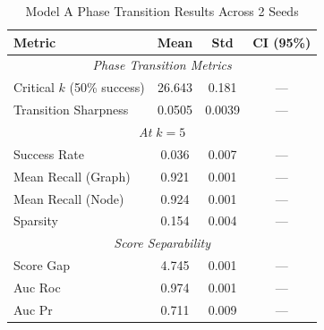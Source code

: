 \begin{table}[htbp]
\centering
\caption{Model A Phase Transition Results Across 2 Seeds}
\label{tab:model_a_results}
\begin{tabular}{lccc}
\hline
\textbf{Metric} & \textbf{Mean} & \textbf{Std} & \textbf{CI (95\%)} \\
\hline
\multicolumn{4}{c}{\textit{Phase Transition Metrics}} \\
Critical $k$ (50\% success) & 26.643 & 0.181 & --- \\
Transition Sharpness & 0.0505 & 0.0039 & --- \\
\hline
\multicolumn{4}{c}{\textit{At $k=5$}} \\
Success Rate & 0.036 & 0.007 & --- \\
Mean Recall (Graph) & 0.921 & 0.001 & --- \\
Mean Recall (Node) & 0.924 & 0.001 & --- \\
Sparsity & 0.154 & 0.004 & --- \\
\hline
\multicolumn{4}{c}{\textit{Score Separability}} \\
Score Gap & 4.745 & 0.001 & --- \\
Auc Roc & 0.974 & 0.001 & --- \\
Auc Pr & 0.711 & 0.009 & --- \\
\hline
\end{tabular}
\end{table}
